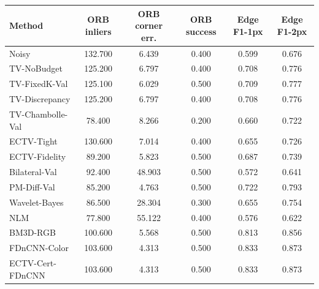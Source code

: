 \begin{tabular}{lccccc}
\toprule
Method & ORB inliers & ORB corner err. & ORB success & Edge F1-1px & Edge F1-2px \\
\midrule
Noisy & 132.700 & 6.439 & 0.400 & 0.599 & 0.676 \\
TV-NoBudget & 125.200 & 6.797 & 0.400 & 0.708 & 0.776 \\
TV-FixedK-Val & 125.100 & 6.029 & 0.500 & 0.709 & 0.777 \\
TV-Discrepancy & 125.200 & 6.797 & 0.400 & 0.708 & 0.776 \\
TV-Chambolle-Val & 78.400 & 8.266 & 0.200 & 0.660 & 0.722 \\
ECTV-Tight & 130.600 & 7.014 & 0.400 & 0.655 & 0.726 \\
ECTV-Fidelity & 89.200 & 5.823 & 0.500 & 0.687 & 0.739 \\
Bilateral-Val & 92.400 & 48.903 & 0.500 & 0.572 & 0.641 \\
PM-Diff-Val & 85.200 & 4.763 & 0.500 & 0.722 & 0.793 \\
Wavelet-Bayes & 86.500 & 28.304 & 0.300 & 0.655 & 0.754 \\
NLM & 77.800 & 55.122 & 0.400 & 0.576 & 0.622 \\
BM3D-RGB & 100.600 & 5.568 & 0.500 & 0.813 & 0.856 \\
FDnCNN-Color & 103.600 & 4.313 & 0.500 & 0.833 & 0.873 \\
ECTV-Cert-FDnCNN & 103.600 & 4.313 & 0.500 & 0.833 & 0.873 \\
\bottomrule
\end{tabular}
